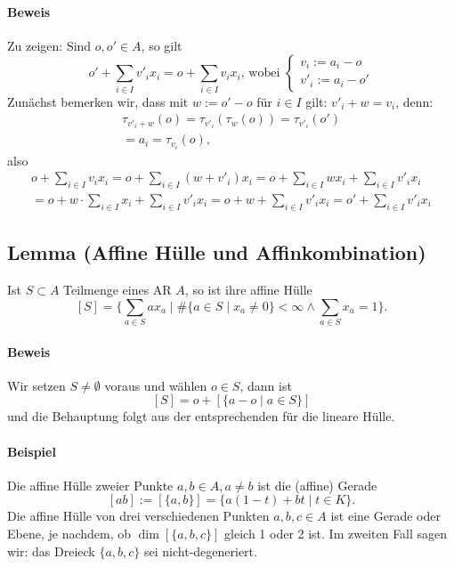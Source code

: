 \paragraph{Beweis}
	Zu zeigen: Sind $ o,o'\in A $, so gilt
	\[ o'+\sum_{i\in I} v'_ix_i = o+\sum_{i\in I} v_ix_i \text{, wobei }
		\begin{cases}
		v_i := a_i-o\\
		v'_i := a_i-o'
		\end{cases}\]
	Zunächst bemerken wir, dass mit $ w:= o'-o $ für $ {i\in I} $ gilt: $ v'_i+w=v_i $, denn:
	\begin{gather*}
		\tau_{v'_i+w}(o) = \tau_{v'_i}(\tau_w(o)) = \tau_{v'_i}(o')\\
		= a_i = \tau_{v_i}(o),
	\end{gather*}
	also
	\begin{gather*}
		o+\sum_{i\in I}v_ix_i = o+\sum_{i\in I} (w+v'_i)x_i = o+ \sum_{i\in I}wx_i + \sum_{i\in I}v'_ix_i\\
		= o+ w\cdot \sum_{i\in I}x_i + \sum_{i\in I}v'_i x_i = o+w + \sum_{i\in I}v'_ix_i = o' + \sum_{i\in I}v'_i x_i
	\end{gather*}
	
\subsection{Lemma (Affine Hülle und Affinkombination)}
	\begin{Lemma}
		Ist $ S\subset A $ Teilmenge eines AR $ A $, so ist ihre affine Hülle
		\[ [S] = \{\sum_{a\in S}ax_a\mid \#\{a\in S\mid x_a\neq 0\}<\infty \land \sum_{a\in S}x_a = 1 \}. \]
	\end{Lemma}
	
\paragraph{Beweis}
	Wir setzen $ S\neq \emptyset $ voraus und wählen $ o\in S $, dann ist
	\[ [S] = o+[\{a-o\mid a\in S\}] \]
	und die Behauptung folgt aus der entsprechenden für die lineare Hülle.
	
\paragraph{Beispiel}
	Die affine Hülle zweier Punkte $ a,b\in A, a\neq b $ ist die (affine) Gerade
	\[ [ab] := [\{a,b\}] = \{a(1-t)+bt\mid t\in K\}. \]
	Die affine Hülle von drei verschiedenen Punkten $ a,b,c\in A $ ist eine Gerade oder Ebene, je nachdem, ob $ \dim[\{a,b,c\}] $ gleich 1 oder 2 ist. Im zweiten Fall sagen wir: das Dreieck $ \{a,b,c\} $ sei nicht-degeneriert.
	
